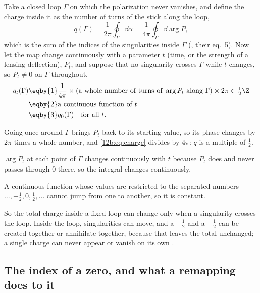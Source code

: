 Take a closed loop $\Gamma$ on which the polarization never vanishes, and define the charge inside it as the number of
turns of the stick along the loop,
\begin{equation}
  q(\Gamma)=\frac{1}{2\pi}\oint_\Gamma\dd\alpha=\frac{1}{4\pi}\oint_\Gamma\dd\arg P ,
  \label{12b:eq:charge}
\end{equation}
which is the sum of the indices of the singularities inside $\Gamma$ (\cite{VachaspatiLue2003}, their eq.~5). Now let
the map change continuously with a parameter $t$ (time, or the strength of a lensing deflection), $P_t$, and suppose
that no singularity crosses $\Gamma$ while $t$ changes, so $P_t\neq0$ on $\Gamma$ throughout.
\begin{align}
  q_t(\Gamma)
  &\eqby{1}\frac{1}{4\pi}\times(\text{a whole number of turns of }\arg P_t\text{ along }\Gamma)\times2\pi
   \in\tfrac12\Z\nonumber\\
  &\eqby{2}\text{a continuous function of }t\nonumber\\
  &\eqby{3}q_0(\Gamma)\quad\text{for all }t .
  \label{12b:eq:charge-const}
\end{align}
\begin{explain}
  \item Going once around $\Gamma$ brings $P_t$ back to its starting value, so its phase changes by $2\pi$ times a whole
        number, and \eqref{12b:eq:charge} divides by $4\pi$: $q$ is a multiple of $\frac12$.
  \item $\arg P_t$ at each point of $\Gamma$ changes continuously with $t$ because $P_t$ does and never passes through
        $0$ there, so the integral changes continuously.
  \item A continuous function whose values are restricted to the separated numbers $\dots,-\frac12,0,\frac12,\dots$
        cannot jump from one to another, so it is constant.
\end{explain}
So the total charge inside a fixed loop can change only when a singularity crosses the loop. Inside the loop,
singularities can move, and a $+\frac12$ and a $-\frac12$ can be created together or annihilate together, because that
leaves the total unchanged; a single charge can never appear or vanish on its own \cite{VachaspatiLue2003}.

\subsection{The index of a zero, and what a remapping does to it}
\label{12b:sec:index-det}

